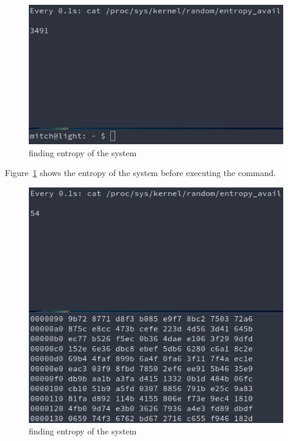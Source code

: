 \documentclass[12pt]{article}
\begin{document}
\begin{figure}[H]
    \begin{center}
        \includegraphics[scale=0.6]{t4p0.png}
    \end{center}{}
    \caption{finding entropy of the system}
    \label{fig:t4p0}
\end{figure}

Figure~\ref{fig:t4p0} shows the entropy of the system before executing the command.

\begin{figure}[H]
    \begin{center}
        \includegraphics[scale=0.6]{t4p1.png}
    \end{center}{}
    \caption{finding entropy of the system}
    \label{fig:t4p1}
\end{figure}
\end{document}
